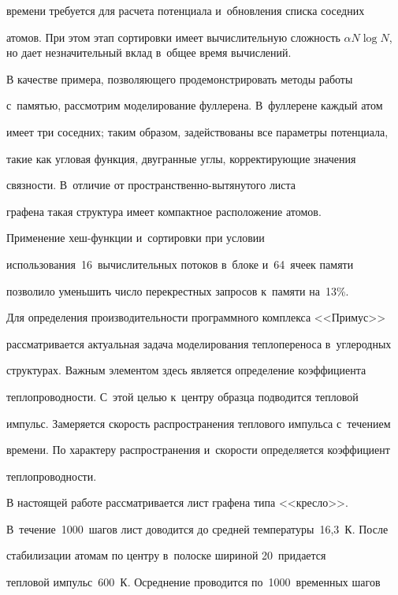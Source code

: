 времени требуется для расчета потенциала и~обновления списка соседних 

атомов. При этом этап сортировки имеет вычислительную сложность $\alpha 

N\log N$, но дает незначительный вклад в~общее время вычислений.

  

  В качестве примера, позволяющего продемонстрировать методы работы 

с~памятью, рассмотрим моделирование фуллерена. В~фуллерене каждый атом 

имеет три соседних; таким образом, задействованы все параметры потенциала, 

такие как угловая функция, двугранные углы, корректирующие значения 

связности. В~отличие от про\-стран\-ст\-вен\-но-вы\-тя\-ну\-то\-го листа 

графена такая структура имеет компактное расположение атомов. 

  

  Применение хеш-функции и~сортировки при условии 

использования~16~вычислительных потоков в~блоке и~64~ячеек памяти 

позволило уменьшить число перекрестных запросов к~памяти на~13\%. 

  

  Для определения производительности программного комплекса <<Примус>> 

рассматривается актуальная задача моделирования теплопереноса в~углеродных 

структурах. Важным элементом здесь является определение коэффициента 

теп\-ло\-про\-вод\-ности. С~этой целью к~центру образца подводится тепловой 

импульс. Замеряется скорость распространения теплового импульса с~течением 

времени. По характеру распространения и~скорости определяется коэффициент 

теплопроводности. 

  

  В настоящей работе рассматривается лист графена типа <<кресло>>. 

В~течение~1000~шагов лист доводится до средней температуры~16,3~К. После 

стабилизации атомам по центру в~полоске шириной 20{\ptb{\AA}}\ придается 

тепловой импульс~600~К. Осреднение проводится по~1000~временных шагов 

